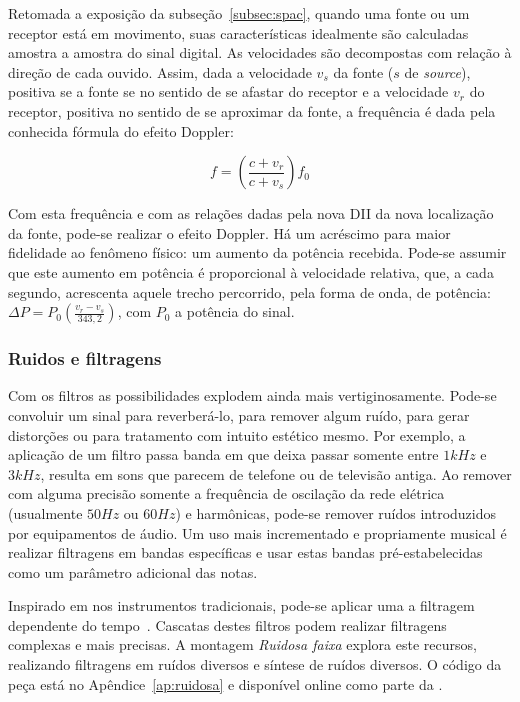 Retomada a exposição da subseção~\ref{subsec:spac}, quando uma fonte ou um receptor está em movimento, suas características idealmente são calculadas amostra a amostra do sinal digital. As velocidades são decompostas com relação à direção de cada ouvido. Assim, dada a velocidade $v_s$ da fonte ($s$ de \emph{source}), positiva se a fonte se no sentido de se afastar do receptor e a velocidade $v_r$ do receptor, positiva no sentido de se aproximar da fonte, a frequência é dada pela conhecida fórmula do efeito Doppler:

\begin{equation}
    f=\left(\frac{c+v_r}{c+v_s}\right)f_0
\end{equation}

Com esta frequência e com as relações dadas pela nova DII da nova localização da fonte, pode-se realizar o efeito Doppler. Há um acréscimo para maior fidelidade ao fenômeno físico: um aumento da potência recebida. Pode-se assumir que este aumento em potência é proporcional à velocidade relativa, que, a cada segundo, acrescenta aquele trecho percorrido, pela forma de onda, de potência: $\Delta P=P_0\left(\frac{v_r-v_s}{343,2}\right)$, com $P_0$ a potência do sinal.

\subsubsection{Ruidos e filtragens}
Com os filtros as possibilidades explodem ainda mais vertiginosamente. Pode-se convoluir um sinal para reverberá-lo, para
remover algum ruído, para gerar distorções ou para tratamento com intuito estético mesmo. Por exemplo,
a aplicação de um filtro passa banda em que deixa passar somente entre $1kHz$ e $3kHz$, resulta em sons
que parecem de telefone ou de televisão antiga. Ao remover com alguma precisão somente
a frequência de oscilação da rede elétrica (usualmente $50Hz$ ou $60Hz$) e harmônicas, pode-se remover
ruídos introduzidos por equipamentos de áudio.
Um uso mais incrementado
e propriamente musical é realizar filtragens em bandas específicas e usar estas bandas
pré-estabelecidas como um parâmetro adicional das notas.

Inspirado em nos instrumentos tradicionais, pode-se aplicar uma a filtragem dependente do tempo~\cite{Roederer}.
Cascatas
destes filtros podem realizar filtragens complexas e mais precisas. A montagem \emph{Ruidosa faixa} explora
este recursos, realizando filtragens em ruídos diversos e síntese de ruídos diversos. O código da peça está no Apêndice~\ref{ap:ruidosa} e disponível online como parte da \massa.

